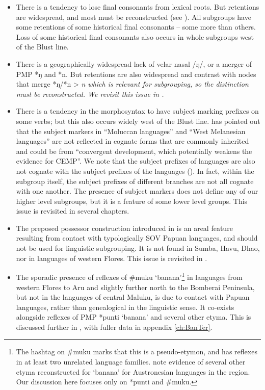 \begin{itemize}
\item There is a tendency to lose final consonants from lexical roots.
			But retentions are widespread,
			and most must be reconstructed (see ).
			All subgroups have some retentions of some historical final consonants -- some more than others.
			Loss of some historical final consonants also occurs in whole subgroups west of the Blust line.
\item There is a geographically widespread lack of velar nasal /ŋ/,
			or a merger of PMP *ŋ and *n.
			But retentions are also widespread
			and contrast with nodes that merge *ŋ/*n > \it{n} which is relevant for subgrouping,
			so the distinction must be reconstructed.
			We revisit this issue in .
\item There is a tendency in the morphosyntax to have subject marking prefixes on some verbs;
			but this also occurs widely west of the Blust line.
			\citet[25]{Adelaar2005} has pointed out that the subject markers in “Moluccan languages”
			and “West Melanesian languages” are not reflected in cognate forms that are commonly inherited
			and could be from “convergent development,
			which potentially weakens the evidence for CEMP”.
			We note that the subject prefixes of  languages are also not cognate with the subject
			prefixes of the  languages ().
			In fact, within the  subgroup itself,
			the subject prefixes of different branches are not all cognate with one another.
			The presence of subject markers does not define any of our higher level subgroups,
			but it is a feature of some lower level groups.
			This issue is revisited in several chapters.
\item The preposed possessor construction introduced in 
			is an areal feature resulting from contact
			with typologically SOV Papuan languages,
			and should not be used for linguistic subgrouping.
			It is not found in Sumba,
			Havu, Dhao, nor in languages of western Flores.
			This issue is revisited in .
\item The sporadic presence of reflexes of {\#}muku ‘banana’\footnote{
				The hashtag on {\#}muku marks that this
				is a pseudo-etymon, and has reflexes in at least two unrelated language families.
				\citet{DonohueDenham2009} note evidence of several other etyma
				reconstructed for ‘banana’ for Austronesian languages in the region.
				Our discussion here focuses only on *punti
				and {\#}muku.}
			in languages from western Flores to
			Aru and slightly further north to the Bomberai Peninsula,
			but not in the languages of central Maluku,
			is due to contact with Papuan languages,
			rather than genealogical in the linguistic sense.
			 It co-exists alongside reflexes of PMP *punti ‘banana’
			and several other etyma.
			This is discussed further in ,
			with fuller data in appendix \ref{ch:BanTer}.
\end{itemize}


